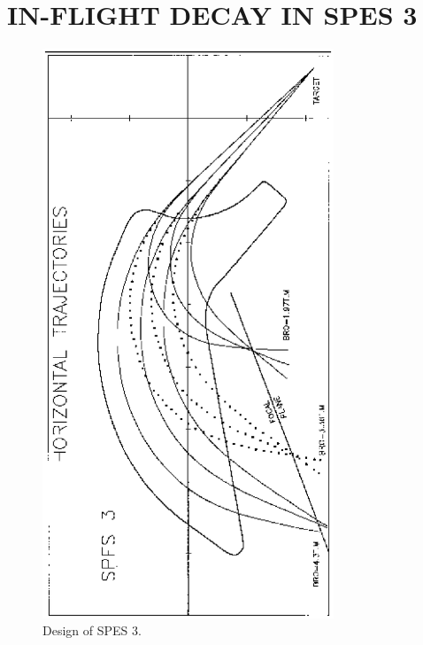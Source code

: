  \clearpage


\section{IN-FLIGHT DECAY IN SPES 3}
\vfill

\begin{figure}[H]
\centerline{\includegraphics[height=17cm,angle=-90]{FigC3-1.eps}}
\caption{\label{figC31}Design of SPES 3.}
\end{figure}

\vfill
\newpage

